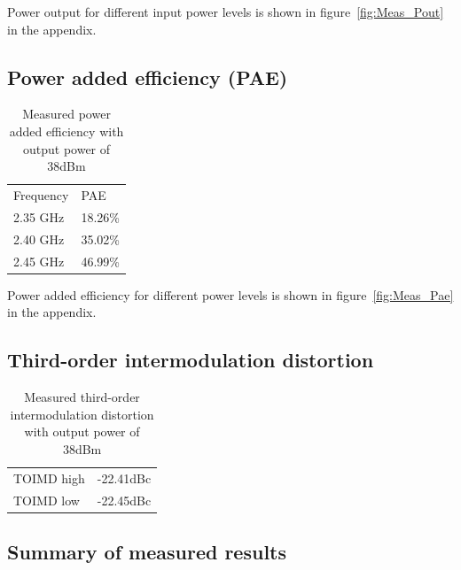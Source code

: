   Power output for different input power levels is shown in figure~\ref{fig:Meas_Pout} in the appendix.

  \subsection{Power added efficiency (PAE)}


  \begin{table}[H]
	  \centering
	  \begin{tabular}{l l}
		  Frequency & PAE \\
		  2.35 GHz & 18.26\% \\
		  2.40 GHz & 35.02\% \\
		  2.45 GHz & 46.99\%
	  \end{tabular}
	  \caption{Measured power added efficiency with output power of 38dBm}
	  \label{tab:Meas_Pae}
  \end{table}

  Power added efficiency for different power levels is shown in figure~\ref{fig:Meas_Pae} in the appendix.

  \subsection{Third-order intermodulation distortion}

    \begin{table}[H]
	  \centering
	  \begin{tabular}{l l}
		  TOIMD high & -22.41dBc \\
		  TOIMD low & -22.45dBc
	  \end{tabular}
	  \caption{Measured third-order intermodulation distortion with output power of 38dBm}
	  \label{tab:Meas_Toimd}
  \end{table}

  \subsection{Summary of measured results}

